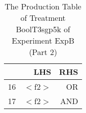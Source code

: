 \begin{table}[ht]
\centering
\begin{tabular}{rrr}
  \hline
 & LHS & RHS \\ 
  \hline
16 & $<$f2$>$ & OR \\ 
  17 & $<$f2$>$ & AND \\ 
   \hline
\end{tabular}
\caption{The Production Table of Treatment BoolT3sgp5k of Experiment ExpB (Part 2)} 
\end{table}
